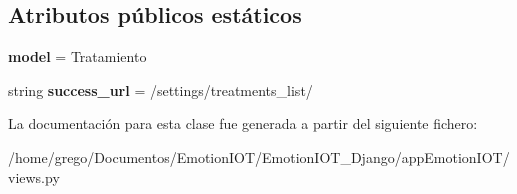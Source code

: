 \subsection*{Atributos públicos estáticos}
\begin{DoxyCompactItemize}
\item 
{\bfseries model} = Tratamiento\hypertarget{classappEmotionIOT_1_1views_1_1Tratamiento__delete_abc04c96c11eb34deccf604de779fc915}{}\label{classappEmotionIOT_1_1views_1_1Tratamiento__delete_abc04c96c11eb34deccf604de779fc915}

\item 
string {\bfseries success\+\_\+url} = \textquotesingle{}/settings/treatments\+\_\+list/\textquotesingle{}\hypertarget{classappEmotionIOT_1_1views_1_1Tratamiento__delete_af1190999cae60c11e031e65387bd772d}{}\label{classappEmotionIOT_1_1views_1_1Tratamiento__delete_af1190999cae60c11e031e65387bd772d}

\end{DoxyCompactItemize}


La documentación para esta clase fue generada a partir del siguiente fichero\+:\begin{DoxyCompactItemize}
\item 
/home/grego/\+Documentos/\+Emotion\+I\+O\+T/\+Emotion\+I\+O\+T\+\_\+\+Django/app\+Emotion\+I\+O\+T/views.\+py\end{DoxyCompactItemize}
